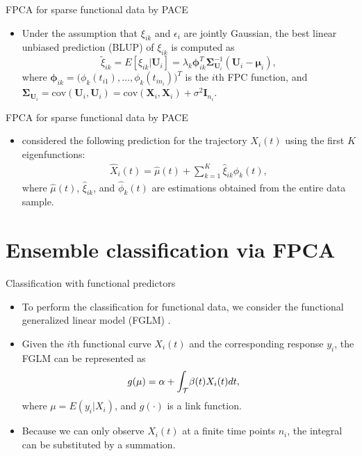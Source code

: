 \documentclass{beamer}
\def \bX { \mathbf{ X } }
\def \bU { \mathbf{ U } }
\def \bmu { \boldsymbol{ \mu } }
\def \bSigma { \boldsymbol{ \Sigma } }
\def \bphi { \boldsymbol{ \phi } }
\begin{document}
\begin{frame}{FPCA for sparse functional data by PACE}
	\begin{itemize}
		\item{
			Under the assumption that $\xi_{ik}$ and $\epsilon_i$ are jointly Gaussian, the best linear unbiased prediction (BLUP) of $\xi_{ik}$ is computed as
			\begin{equation*}
			\tilde \xi_{ik} = E[\xi_{ik} \vert \bU_i] = \lambda_k \bphi_{ik}^T\bSigma_{\bU_i}^{-1}(\bU_i - \bmu_i), 
			\end{equation*}
			where $\bphi_{ik} = \big( \phi_k(t_{i1}), \dots, \phi_k(t_{in_i}) \big)^T$ is the $i$th FPC function, and $\bSigma_{\bU_i} = \text{cov}(\bU_i, \bU_i) = \text{cov}(\bX_i, \bX_i) + \sigma^2\mathbf{I}_{n_i}$.
		}
	\end{itemize}
\end{frame}

\begin{frame}{FPCA for sparse functional data by PACE}
	\begin{itemize}
		\item{
			\cite{Yao2005} considered the following prediction for the trajectory $X_i(t)$ using the first $K$ eigenfunctions:
			\begin{eqnarray*}
				\hat X_i(t) =\hat  \mu(t) + \sum_{k=1}^K \hat\xi_{ik} \hat \phi_k(t) ,
			\end{eqnarray*}
			where $\hat  \mu(t)$,  $\hat\xi_{ik}$, and  $\hat \phi_k(t) $ are estimations obtained from the entire data sample.
		}
	\end{itemize}
\end{frame}



\section{Ensemble classification via FPCA}

\begin{frame}{Classification with functional predictors}
	\begin{itemize}
		\item{
			To perform the classification for functional data, we consider the functional generalized linear model (FGLM) \citep{James2002, Muller2005}.
		}
		\item{
			Given the $i$th functional curve $X_i(t)$ and the corresponding response $y_i$, the FGLM can be represented as
			\begin{eqnarray}
			g(\mu) &= \alpha + \mathlarger{\int}_{\mathcal{T}} \beta(t) X_i(t) dt ,
			\label{fglm}
			\end{eqnarray}
			where $\mu = E(y_i | X_i)$, and $g(\cdot)$ is a link function. 
		}
		\item{
			Because we can only observe $X_i(t)$ at a finite time points $n_i$, the integral can be substituted by a summation. 
		}
	\end{itemize}
\end{frame}
\end{document}
